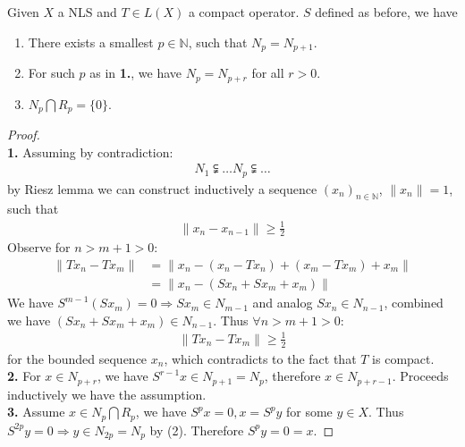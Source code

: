 \begin{lemma}
	Given $X$ a NLS and $T \in L(X)$ a compact operator. $S$ defined as before, we have
	\begin{enumerate}
		\item There exists a smallest $p \in \mathbb{N}$, such that $N_p = N_{p+1}$. 
		\item For such $p$ as in \textbf{1.}, we have $N_{p} = N_{p + r}$ for all $r >0$.
		\item $N_p \bigcap R_p = \{0\}$.
	\end{enumerate}
\end{lemma}
\begin{proof}
	\quad\\
\textbf{1.} Assuming by contradiction:
\begin{align*}
	N_1 \subsetneqq \dots N_{p} \subsetneqq \dots
\end{align*}
by Riesz lemma we can construct inductively a sequence $(x_n)_{n \in \mathbb{N}}$, $\|x_n\| = 1$, such that
\begin{align*}
	\| x_n - x_{n-1}\| \geq \frac{1}{2}
\end{align*}
Observe for $n > m+1>0$:
\begin{align*}
	\|Tx_n - Tx_m \|  &= \|x_n - (x_n -Tx_n) + (x_m - Tx_m) + x_m\|\\
	&=  \|x_n - (S x_n + Sx_m + x_m) \|
\end{align*}
We have $S^{m-1}(Sx_m) = 0 \Rightarrow Sx_m \in N_{m -1}$ and analog $Sx_n \in N_{n-1}$, combined we have $(Sx_n + Sx_m + x_m) \in N_{n-1}$. Thus $\forall n > m+1 >0:$
\begin{align*}
	\|Tx_n - Tx_m\| \geq \frac{1}{2}
\end{align*} 
for the bounded sequence $x_n$, which contradicts to the fact that $T$ is compact.\\
\textbf{2.} For $x \in N_{p+ r}$, we have $S^{r -1}x \in N_{p+1} = N_p$, therefore $x \in N_{p+r -1}$. Proceeds inductively we have the assumption. \\
\textbf{3.} Assume $x \in N_p \bigcap R_p$, we have $S^p x = 0, x = S^p y $ for some $y \in X$. Thus $S^{2p}y = 0 \Rightarrow y \in N_{2p} = N_p$ by (2). Therefore $S^py = 0 = x$.
\end{proof}

